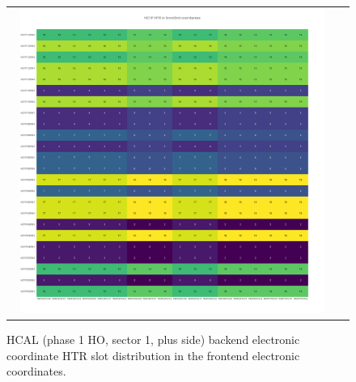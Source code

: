 \begin{figure}[htb]
 \begin{center}
  \begin{tabular}{cc}
   \includegraphics[angle=0,width=0.95\textwidth]{figures/appendix/HO1P_HTR_in_FrontEnd.png}
  \end{tabular}
  \caption{HCAL (phase 1 HO, sector 1, plus side) backend electronic coordinate HTR slot distribution in the frontend electronic coordinates.}
  \label{fig:lmapHO1PHTRFEC}
 \end{center}
\end{figure}
\clearpage

